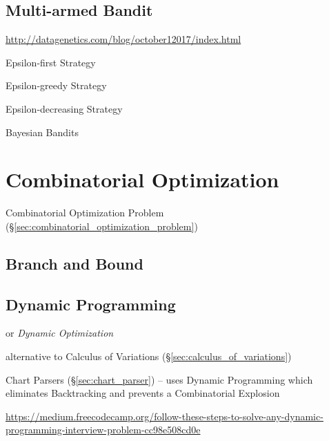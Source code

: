 \subsection{Multi-armed Bandit}\label{sec:multiarmed_bandit}

\url{http://datagenetics.com/blog/october12017/index.html}

Epsilon-first Strategy

Epsilon-greedy Strategy

Epsilon-decreasing Strategy

Bayesian Bandits



\section{Combinatorial Optimization}
\label{sec:combinatorial_optimization}

\fist Combinatorial Optimization Problem
(\S\ref{sec:combinatorial_optimization_problem})



\subsection{Branch and Bound}\label{sec:branch_and_bound}

\subsection{Dynamic Programming}\label{sec:dynamic_programming}

or \emph{Dynamic Optimization}

alternative to Calculus of Variations (\S\ref{sec:calculus_of_variations})

\fist Chart Parsers (\S\ref{sec:chart_parser}) -- uses Dynamic Programming which
eliminates Backtracking and prevents a Combinatorial Explosion

\url{https://medium.freecodecamp.org/follow-these-steps-to-solve-any-dynamic-programming-interview-problem-cc98e508cd0e}



